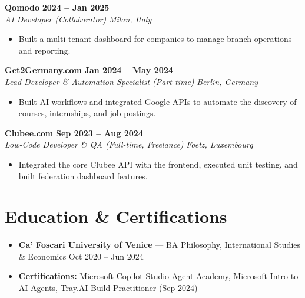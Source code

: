 \documentclass[a4paper,10pt]{article}
\newcommand{\role}[4]{%
 \textbf{#1} \hfill \textbf{#2}\\[1pt]%
 \textit{#3} \hfill \textit{#4}\\[2pt]%
}
\begin{document}
\role{Qomodo}{2024 -- Jan 2025}{AI Developer (Collaborator)}{Milan, Italy}
\begin{itemize}
 \item Built a multi-tenant dashboard for companies to manage branch operations and reporting.
\end{itemize}

\role{\href{https://get2germany.com}{Get2Germany.com}}{Jan 2024 -- May 2024}{Lead Developer \& Automation Specialist (Part-time)}{Berlin, Germany}
\begin{itemize}
 \item Built AI workflows and integrated Google APIs to automate the discovery of courses, internships, and job postings.
\end{itemize}

\role{\href{https://clubee.com}{Clubee.com}}{Sep 2023 -- Aug 2024}{Low-Code Developer \& QA (Full-time, Freelance)}{Foetz, Luxembourg}
\begin{itemize}
 \item Integrated the core Clubee API with the frontend, executed unit testing, and built federation dashboard features.
\end{itemize}

\section{Education \& Certifications}
\begin{itemize}
 \item \textbf{Ca' Foscari University of Venice} --- BA Philosophy, International Studies \& Economics \hfill Oct 2020 -- Jun 2024
 \item \textbf{Certifications:} Microsoft Copilot Studio Agent Academy, Microsoft Intro to AI Agents, Tray.AI Build Practitioner (Sep 2024)
\end{itemize}
\end{document}
